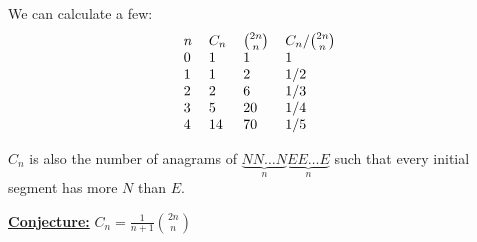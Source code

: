 \documentclass[12pt]{article}
\begin{document}
We can calculate a few:
\[\begin{tabular}{llll}
    $n$ & $C_n$ & $2n\choose n$ & $C_n/{2n\choose n}$ \\
    0 & 1   & 1   & 1   \\
    1 & 1   & 2   & 1/2 \\
    2 & 2   & 6   & 1/3 \\
    3 & 5   & 20  & 1/4 \\
    4 & 14  & 70  & 1/5
    \end{tabular}\]



\eg $C_n$ is also the number of anagrams of $\underset{n}{\underbrace{NN\dots N}}\underset{n}{\underbrace{EE\dots E}}$ such that every initial segment has more $N$ than $E$.

\textbf{\underline{Conjecture:}} $\displaystyle C_n=\frac{1}{n+1}{2n\choose n}$
\end{document}

